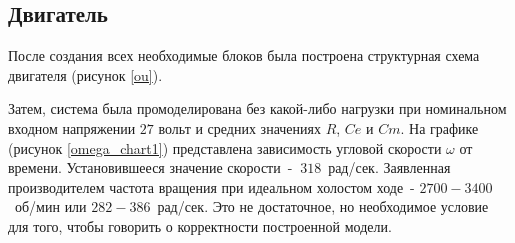 \subsection{Двигатель}

После создания всех необходимые блоков была построена структурная схема двигателя (рисунок \ref{ou}).


Затем, система была промоделирована без какой-либо нагрузки при номинальном входном 
напряжении $27$ вольт и средних значениях $R$, $Ce$ и $Cm$. На графике (рисунок \ref{omega_chart1}) 
представлена зависимость угловой скорости $\omega$ от времени. Установившееся значение скорости~- $~318$~рад/сек. Заявленная
производителем частота вращения при идеальном холостом ходе~- $2700-3400$~об/мин или $282-386$~рад/сек. Это 
не достаточное, но необходимое условие для того, чтобы говорить о корректности построенной модели.

